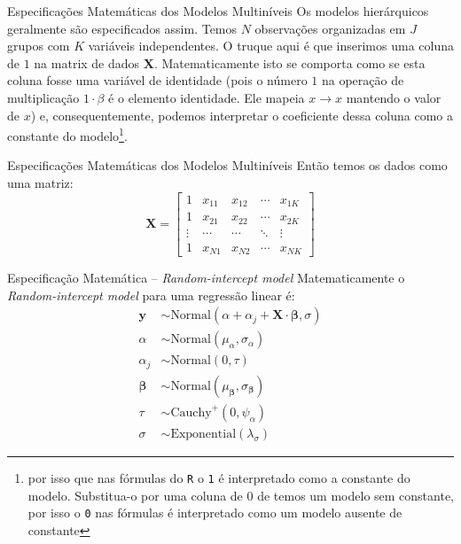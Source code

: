 \begin{frame}{Especificações Matemáticas dos Modelos Multiníveis}
	Os modelos hierárquicos geralmente são especificados assim.
	\vfill
	Temos $N$ observações organizadas em $J$ grupos com $K$ variáveis independentes.
	\vfill
	O truque aqui é que inserimos uma coluna de $1$ na matrix de dados $\mathbf{X}$.
	Matematicamente isto se comporta como se esta coluna fosse uma variável de identidade
	(pois o número $1$ na operação de multiplicação $1 \cdot \beta$ é o elemento identidade.
	Ele mapeia $x \to x$ mantendo o valor de $x$) e, consequentemente, podemos interpretar o
	coeficiente dessa coluna como a constante do modelo\footnote{por isso que nas fórmulas do
		\texttt{R} o \texttt{1} é interpretado como a constante do modelo. Substitua-o por uma coluna
		de $0$ de temos um modelo sem constante, por isso o \texttt{0} nas fórmulas é interpretado
		como um modelo ausente de constante}.
\end{frame}

\begin{frame}{Especificações Matemáticas dos Modelos Multiníveis}
	Então temos os dados como uma matriz:
	$$
		\mathbf{X} =
		\begin{bmatrix}
			1      & x_{11} & x_{12} & \cdots & x_{1K} \\
			1      & x_{21} & x_{22} & \cdots & x_{2K} \\
			\vdots & \cdots & \cdots & \ddots & \vdots \\
			1      & x_{N1} & x_{N2} & \cdots & x_{NK}
		\end{bmatrix}
	$$
\end{frame}

\begin{frame}{Especificação Matemática -- \textit{Random-intercept model}}
	Matematicamente o \textit{Random-intercept model} para uma regressão linear é:
	$$
		\begin{aligned}
			\mathbf{y}         & \sim \text{Normal}\left( \alpha + \alpha_j + \mathbf{X} \cdot \boldsymbol{\beta}, \sigma \right) \\
			\alpha             & \sim \text{Normal}(\mu_\alpha, \sigma_\alpha)                                                    \\
			\alpha_j           & \sim \text{Normal}(0, \tau)                                                                      \\
			\boldsymbol{\beta} & \sim \text{Normal}(\mu_{\boldsymbol{\beta}}, \sigma_{\boldsymbol{\beta}})                        \\
			\tau               & \sim \text{Cauchy}^+(0, \psi_{\alpha})                                                           \\
			\sigma             & \sim \text{Exponential}(\lambda_\sigma)
		\end{aligned}
	$$
\end{frame}

